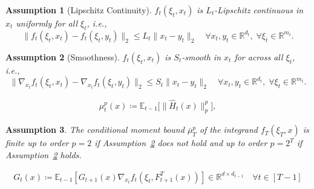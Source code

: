 \documentclass[10pt,a4paper]{amsart}
\newtheorem{assumption}{Assumption}
\newcommand{\EE}{\mathbb{E}}
\newcommand{\RR}{\mathbb{R}}
\begin{document}
\begin{assumption}[Lipschitz Continuity] 
\label{assump:lipschitz}
   $f_t(\xi_t,x_t)$ is $L_t$-Lipschitz continuous in $x_t$ uniformly for all $\xi_t$, i.e.,
    $$ \|f_t(\xi_t,x_t) -  f_t(\xi_t,y_t)\|_2 \leq L_t\|x_t-y_t\|_2 \quad \forall x_t,y_t \in \RR^{d_t},\; \forall \xi_t\in\RR^{m_t}.$$
\end{assumption}

\begin{assumption}[Smoothness] 
\label{assump:smooth}
 $f_t(\xi_t,x_t)$ is $S_t$-smooth in $x_t$ for across all $\xi_{t}$, i.e., 
  $$\|\nabla_{x_t} f_t(\xi_t,x_t) - \nabla_{x_t} f_t(\xi_t,y_t) \|_2\leq S_t\|x_t-y_t\|_2\quad \forall x_t,y_t\in \RR^{d_t},\; \forall \xi_t\in\RR^{m_t}.$$
\end{assumption}

\begin{align}
\label{eq:mu}
    \mu_t^{p}(x) \coloneqq \EE_{t-1}\big[\|\hat{H}_t(x)\|_p^p \big],
\end{align}

\begin{assumption}\label{assump:mu_bar}
    The conditional moment bound $\overline{\mu}_T^p $ of the integrand $f_T(\xi_T,x)$ is finite up to order $p=2$ if Assumption~\ref{assump:smooth} does not hold and up to order $p=2^T$ if Assumption~\ref{assump:smooth} holds.
\end{assumption}

\begin{align}\label{eq:G_t}
    G_t(x) \coloneqq \EE_{t-1}\left[G_{t+1}(x) \nabla_{x_t} f_t(\xi_t, F_{t+1}^T(x))\right]\in\RR^{d\times d_{t-1}}\quad \forall t\in[T-1]
\end{align}
\end{document}
